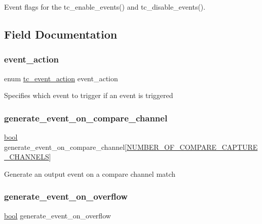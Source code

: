 Event flags for the tc\+\_\+enable\+\_\+events() and tc\+\_\+disable\+\_\+events(). 

\subsection{Field Documentation}
\mbox{\label{structtc__events_a8d0cfdde8f5a4e2e61865c1f93ca309e}} 
\subsubsection{\texorpdfstring{event\_action}{event\_action}}
{\footnotesize\ttfamily enum \mbox{\hyperlink{group__asfdoc__sam0__tc__group_ga4dcbf6cdb74bc3b7609ce8d16549462f}{tc\+\_\+event\+\_\+action}} event\+\_\+action}

Specifies which event to trigger if an event is triggered \mbox{\label{structtc__events_a4317ebe6ee0706835fb2146672afd8c8}} 
\subsubsection{\texorpdfstring{generate\_event\_on\_compare\_channel}{generate\_event\_on\_compare\_channel}}
{\footnotesize\ttfamily \mbox{\hyperlink{group__group__sam0__utils_ga97a80ca1602ebf2303258971a2c938e2}{bool}} generate\+\_\+event\+\_\+on\+\_\+compare\+\_\+channel\mbox{[}\mbox{\hyperlink{group__asfdoc__sam0__tc__group_gac837f9db5df1793578c195a979c6a9d3}{N\+U\+M\+B\+E\+R\+\_\+\+O\+F\+\_\+\+C\+O\+M\+P\+A\+R\+E\+\_\+\+C\+A\+P\+T\+U\+R\+E\+\_\+\+C\+H\+A\+N\+N\+E\+LS}}\mbox{]}}

Generate an output event on a compare channel match \mbox{\label{structtc__events_a94a6bf0d78fb0f99a092994a7ec6d2dd}} 
\subsubsection{\texorpdfstring{generate\_event\_on\_overflow}{generate\_event\_on\_overflow}}
{\footnotesize\ttfamily \mbox{\hyperlink{group__group__sam0__utils_ga97a80ca1602ebf2303258971a2c938e2}{bool}} generate\+\_\+event\+\_\+on\+\_\+overflow}

